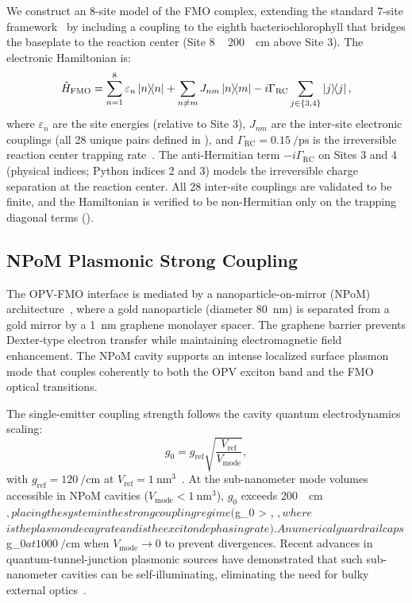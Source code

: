 \documentclass[twocolumn]{article}
\begin{document}
We construct an 8-site model of the FMO complex, extending the standard 7-site framework~\cite{Adolphs2006} by including a coupling to the eighth bacteriochlorophyll that bridges the baseplate to the reaction center (Site 8 ~ \SI{200}{\per\cm} above Site 3).
The electronic Hamiltonian is:
\begin{equation}
\hat{H}_{\mathrm{FMO}} = \sum_{n=1}^{8} \varepsilon_n \dyad{n} + \sum_{n \neq m} J_{nm} \dyad{n}{m} - i\Gamma_{\mathrm{RC}} \sum_{j \in \{3,4\}} \dyad{j}{j},
\label{eq:fmo_hamiltonian}
\end{equation}
where $\varepsilon_n$ are the site energies (relative to Site 3), $J_{nm}$ are the inter-site electronic couplings (all 28 unique pairs defined in ), and $\Gamma_{\mathrm{RC}} = \SI{0.15}{\per\ps}$ is the irreversible reaction center trapping rate~\cite{Renger2003}.
The anti-Hermitian term $-i\Gamma_{\mathrm{RC}}$ on Sites 3 and 4 (physical indices; Python indices 2 and 3) models the irreversible charge separation at the reaction center.
All 28 inter-site couplings are validated to be finite, and the Hamiltonian is verified to be non-Hermitian only on the trapping diagonal terms ().

\subsection*{NPoM Plasmonic Strong Coupling}

The OPV-FMO interface is mediated by a nanoparticle-on-mirror (NPoM) architecture~\cite{Chikkaraddy2016}, where a gold nanoparticle (diameter \SI{80}{\nm}) is separated from a gold mirror by a \SI{1}{\nm} graphene monolayer spacer.
The graphene barrier prevents Dexter-type electron transfer while maintaining electromagnetic field enhancement.
The NPoM cavity supports an intense localized surface plasmon mode that couples coherently to both the OPV exciton band and the FMO optical transitions.

The single-emitter coupling strength follows the cavity quantum electrodynamics scaling:
\begin{equation}
g_0 = g_{\mathrm{ref}} \sqrt{\frac{V_{\mathrm{ref}}}{V_{\mathrm{mode}}}},
\label{eq:coupling_scaling}
\end{equation}
with $g_{\mathrm{ref}} = \SI{120}{\per\cm}$ at $V_{\mathrm{ref}} = \SI{1}{\nm\cubed}$~\cite{Chikkaraddy2016}.
At the sub-nanometer mode volumes accessible in NPoM cavities ($V_{\mathrm{mode}} < \SI{1}{\nm\cubed}$), $g_0$ exceeds \SI{200}{\per\cm}$, placing the system in the strong coupling regime ($g_0 > \kappa, \gamma$, where $\kappa$ is the plasmon decay rate and $\gamma$ is the exciton dephasing rate).
A numerical guardrail caps $g_0$ at \SI{1000}{\per\cm}$ when $V_{\mathrm{mode}} \to 0$ to prevent divergences.
Recent advances in quantum-tunnel-junction plasmonic sources have demonstrated that such sub-nanometer cavities can be self-illuminating, eliminating the need for bulky external optics~\cite{Lee2025}.
\end{document}
